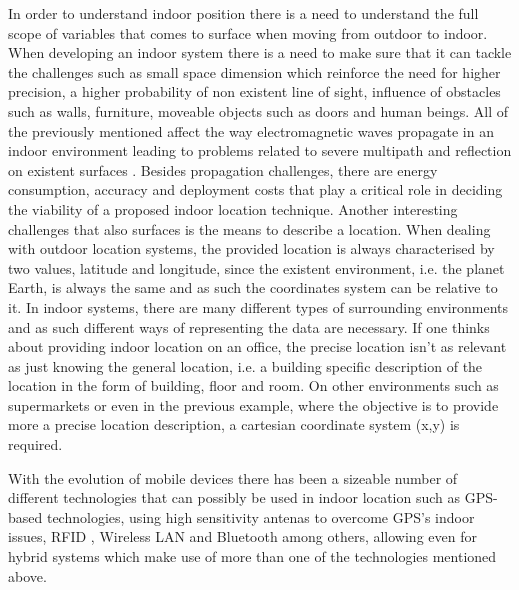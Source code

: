 \documentclass[a4paper]{IEEEtran}
\begin{document}
 
In order to understand indoor position there is a need to understand the full scope of variables that comes to surface when moving from outdoor to indoor. When developing an indoor system there is a need to make sure that it can tackle the challenges such as small space dimension which reinforce the need for higher precision, a higher probability of non existent line of sight, influence of obstacles such as walls, furniture, moveable objects such as doors and human beings\cite{reviewtechniques, survey3}. All of the previously mentioned affect the way electromagnetic waves propagate in an indoor environment leading to problems related to severe multipath and reflection on existent surfaces \cite{surveywireless}. Besides propagation challenges, there are energy consumption, accuracy and deployment costs that play a critical role in deciding the viability of a proposed indoor location technique. Another interesting challenges that also surfaces is the means to describe a location. When dealing with outdoor location systems, the provided location is always characterised by two values, latitude and longitude, since the existent environment, i.e. the planet Earth, is always the same and as such the coordinates system can be relative to it. In indoor systems, there are many different types of surrounding environments and as such different ways of representing the data are necessary. If one thinks about providing indoor location on an office, the precise location isn't as relevant as just knowing the general location, i.e. a building specific description of the location in the form of building, floor and room. On other environments such as supermarkets or even in the previous example, where the objective is to provide more a precise location description, a cartesian coordinate system (x,y) is required. 
 
 
With the evolution of mobile devices there has been a sizeable number of different technologies that can possibly be used in indoor location \cite{surveythesis,survey2} such as GPS-based technologies, using high sensitivity antenas to overcome GPS's indoor issues, RFID , Wireless LAN and Bluetooth among others, allowing even for hybrid systems which make use of more than one of the technologies mentioned above.  
 
\end{document}
